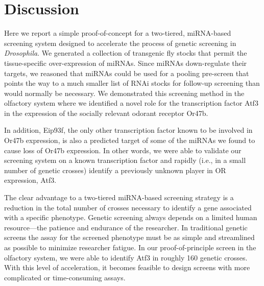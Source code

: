 \section*{Discussion}

Here we report a simple proof-of-concept for a two-tiered, miRNA-based screening system designed to accelerate the process of genetic screening in \emph{Drosophila}.
We generated a collection of transgenic fly stocks that permit the tissue-specific over-expression of miRNAs.
Since miRNAs down-regulate their targets, we reasoned that miRNAs could be used for a pooling pre-screen that points the way to a much smaller list of RNAi stocks for follow-up screening than would normally be necessary.
We demonstrated this screening method in the olfactory system where we identified a novel role for the transcription factor Atf3 in the expression of the socially relevant odorant receptor Or47b.

In addition, Eip93f, the only other transcription factor known to be involved in Or47b expression, is also a predicted target of some of the miRNAs we found to cause loss of Or47b expression.
In other words, we were able to validate our screening system on a known transcription factor and rapidly (i.e., in a small number of genetic crosses) identify a previously unknown player in OR expression, Atf3.

The clear advantage to a two-tiered miRNA-based screening strategy is a reduction in the total number of crosses necessary to identify a gene associated with a specific phenotype.
Genetic screening always depends on a limited human resource---the patience and endurance of the researcher.
In traditional genetic screens the assay for the screened phenotype must be as simple and streamlined as possible to minimize researcher fatigue.
In our proof-of-principle screen in the olfactory system, we were able to identify Atf3 in roughly 160 genetic crosses.
With this level of acceleration, it becomes feasible to design screens with more complicated or time-consuming assays.

